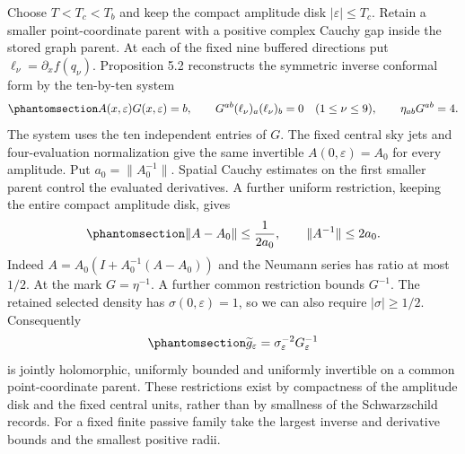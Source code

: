 \documentclass[
  english,
  11pt,
  reqno]{amsart}
\begin{document}
Choose \(T<T_c<T_b\) and keep the compact amplitude disk
\(|\varepsilon|\le T_c\). Retain a smaller point-coordinate parent with
a positive complex Cauchy gap inside the stored graph parent. At each of
the fixed nine buffered directions put \(\ell_\nu=\partial_xf(q_\nu)\).
Proposition 5.2 reconstructs the symmetric inverse conformal form by the
ten-by-ten system
\begin{equation}\protect\phantomsection\label{eq:sh-r1-nine-direction-readout}{
 A(x,\varepsilon)G(x,\varepsilon)=b,\qquad
 G^{ab}(\ell_\nu)_a(\ell_\nu)_b=0\quad(1\le\nu\le9),\qquad
 \eta_{ab}G^{ab}=4.
}\end{equation} The system uses the ten independent entries of \(G\).
The fixed central sky jets and four-evaluation normalization give the
same invertible \(A(0,\varepsilon)=A_0\) for every amplitude. Put
\(a_0=\|A_0^{-1}\|\). Spatial Cauchy estimates on the first smaller
parent control the evaluated derivatives. A further uniform restriction,
keeping the entire compact amplitude disk, gives
\begin{equation}\protect\phantomsection\label{eq:sh-r1-readout-inverse-margin}{
 \|A-A_0\|\le\frac1{2a_0},\qquad
 \|A^{-1}\|\le2a_0.
}\end{equation} Indeed \(A=A_0(I+A_0^{-1}(A-A_0))\) and the Neumann
series has ratio at most \(1/2\). At the mark \(G=\eta^{-1}\). A further
common restriction bounds \(G^{-1}\). The retained selected density has
\(\sigma(0,\varepsilon)=1\), so we can also require \(|\sigma|\ge1/2\).
Consequently
\begin{equation}\protect\phantomsection\label{eq:sh-r1-physical-metric-readout}{
 \widetilde g_\varepsilon=\sigma_\varepsilon^{-2}G_\varepsilon^{-1}
}\end{equation} is jointly holomorphic, uniformly bounded and uniformly
invertible on a common point-coordinate parent. These restrictions exist
by compactness of the amplitude disk and the fixed central units, rather
than by smallness of the Schwarzschild records. For a fixed finite
passive family take the largest inverse and derivative bounds and the
smallest positive radii.
\end{document}
